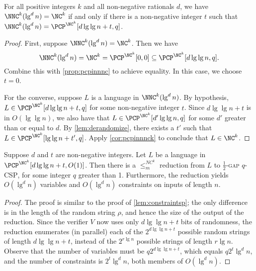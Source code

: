 \documentclass{article}
\begin{document}
\begin{lemma}\label{lem:1}
  For all positive integers $k$ and all non-negative rationals $d$, we have $\NNC^k(\lg^d n) = \NC^k$ if and only if there is a non-negative integer $t$ such that $\NNC^k(\lg^d n) = \PCP^{\NC^k}[d \lg \lg n + t, q]$.
\end{lemma}
\begin{proof}
  First, suppose $\NNC^k(\lg^d n) = \NC^k$.
  Then we have
  \begin{equation*}
    \NNC^k(\lg^d n)
    = \NC^k
    = \PCP^{\NC^k}[0, 0]
    \subseteq \PCP^{\NC^k}[d \lg \lg n, q].
  \end{equation*}
  Combine this with \autoref{prop:pcpinnnc} to achieve equality.
  In this case, we choose $t = 0$.

  For the converse, suppose $L$ is a language in $\NNC^k(\lg^d n)$.
  By hypothesis, $L \in \PCP^{\NC^k}[d \lg \lg n + t, q]$ for some non-negative integer $t$.
  Since $d \lg \lg n + t$ is in $O(\lg \lg n)$, we also have that $L \in \PCP^{\NC^k}[d' \lg \lg n, q]$ for some $d'$ greater than or equal to $d$.
  By \autoref{lem:derandomize}, there exists a $t'$ such that $L \in \PCP^{\NC^k}[\lg \lg n + t', q]$.
  Apply \autoref{cor:pcpinnnck} to conclude that $L \in \NC^k$.
\end{proof}

\begin{lemma}\label{lem:constraintsnc}
  Suppose $d$ and $t$ are non-negative integers.
  Let $L$ be a language in $\PCP^{\NC^k}[d \lg \lg n + t, O(1)]$.
  Then there is a $\leq_m^{NC^k}$ reduction from $L$ to \textsc{$\frac{1}{2}$-gap $q$-CSP}, for some integer $q$ greater than 1.
  Furthermore, the reduction yields $O(\lg^d n)$ variables and $O(\lg^d n)$ constraints on inputs of length $n$.
\end{lemma}
\begin{proof}
  The proof is similar to the proof of \autoref{lem:constraintsp}; the only difference is in the length of the random string $\rho$, and hence the size of the output of the reduction.
  Since the verifier $V$ now uses only $d \lg \lg n + t$ bits of randomness, the reduction enumerates (in parallel) each of the $2^{d \lg \lg n + t}$ possible random strings of length $d \lg \lg n + t$, instead of the $2^{r \lg n}$ possible strings of length $r \lg n$.
  Observe that the number of variables must be $q 2^{d \lg \lg n + t}$, which equals $q 2^t \lg^d n$, and the number of constraints is $2^t \lg^d n$, both members of $O(\lg^d n)$.
\end{proof}
\end{document}
